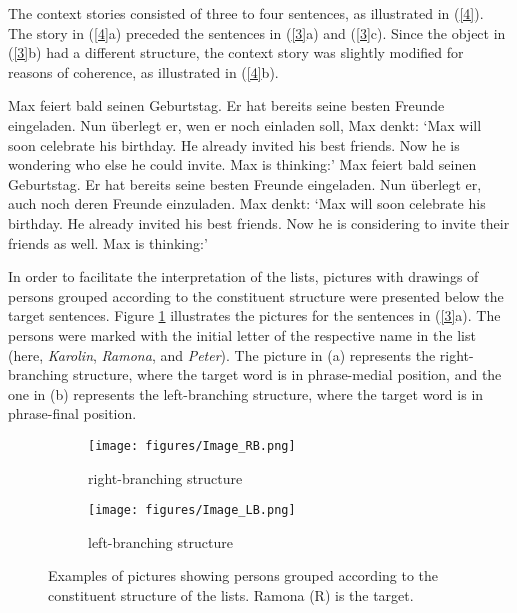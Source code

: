 \documentclass[output=paper]{langscibook}
\begin{document}
The context stories consisted of three to four sentences, as illustrated in (\ref{4}). The story in (\ref{4}a) preceded the sentences in (\ref{3}a) and (\ref{3}c). Since the object in (\ref{3}b) had a different structure, the context story was slightly modified for reasons of coherence, as illustrated in (\ref{4}b).

\ea\label{4}
    \ea Max feiert bald seinen Geburtstag. Er hat bereits seine besten Freunde eingeladen. Nun überlegt er, wen er noch einladen soll, Max denkt:
    \glt ‘Max will soon celebrate his birthday. He already invited his best friends. Now he is wondering who else he could invite. Max is thinking:’
    \ex Max feiert bald seinen Geburtstag. Er hat bereits seine besten Freunde eingeladen. Nun überlegt er, auch noch deren Freunde einzuladen. Max denkt:
    \glt ‘Max will soon celebrate his birthday. He already invited his best friends. Now he is considering to invite their friends as well. Max is thinking:’
    \z
\z

In order to facilitate the interpretation of the lists, pictures with drawings of persons grouped according to the constituent structure were presented below the target sentences. Figure \ref{fig:images} illustrates the pictures for the sentences in (\ref{3}a). The persons were marked with the initial letter of the respective name in the list (here, \textit{Karolin}, \textit{Ramona}, and \textit{Peter}). The picture in (a) represents the right-branching structure, where the target word is in phrase-medial position, and the one in (b) represents the left-branching structure, where the target word is in phrase-final position. 

\begin{figure}
    \begin{subfigure}[b]{.45\linewidth}\centering%
    \texttt{[image: figures/Image\_RB.png]}
    \caption{right-branching structure}
    \end{subfigure}\hfill
    \begin{subfigure}[b]{.45\linewidth}\centering%
    \texttt{[image: figures/Image\_LB.png]}
    \caption{left-branching structure}
    \end{subfigure}
    \caption{Examples of pictures showing persons grouped according to the constituent structure of the lists. Ramona (R) is the target.}
    \label{fig:images}
\end{figure}
\end{document}
